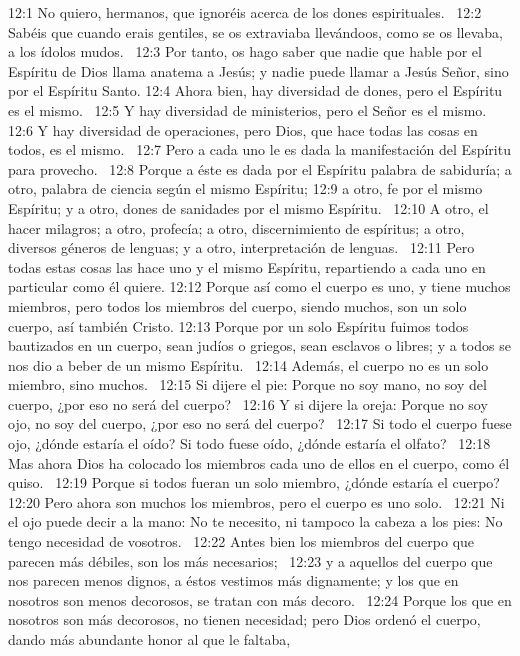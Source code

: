 12:1 No quiero, hermanos, que ignoréis acerca de los dones espirituales.  
12:2 Sabéis que cuando erais gentiles, se os extraviaba llevándoos, como se os llevaba, a los ídolos mudos.  
12:3 Por tanto, os hago saber que nadie que hable por el Espíritu de Dios llama anatema a Jesús; y nadie puede llamar a Jesús Señor, sino por el Espíritu Santo. 
12:4 Ahora bien, hay diversidad de dones, pero el Espíritu es el mismo.  
12:5 Y hay diversidad de ministerios, pero el Señor es el mismo.  
12:6 Y hay diversidad de operaciones, pero Dios, que hace todas las cosas en todos, es el mismo.  
12:7 Pero a cada uno le es dada la manifestación del Espíritu para provecho.  
12:8 Porque a éste es dada por el Espíritu palabra de sabiduría; a otro, palabra de ciencia según el mismo Espíritu; 
12:9 a otro, fe por el mismo Espíritu; y a otro, dones de sanidades por el mismo Espíritu.  
12:10 A otro, el hacer milagros; a otro, profecía; a otro, discernimiento de espíritus; a otro, diversos géneros de lenguas; y a otro, interpretación de lenguas.  
12:11 Pero todas estas cosas las hace uno y el mismo Espíritu, repartiendo a cada uno en particular como él quiere. 
12:12 Porque así como el cuerpo es uno, y tiene muchos miembros, pero todos los miembros del cuerpo, siendo muchos, son un solo cuerpo, así también Cristo. 
12:13 Porque por un solo Espíritu fuimos todos bautizados en un cuerpo, sean judíos o griegos, sean esclavos o libres; y a todos se nos dio a beber de un mismo Espíritu.  
12:14 Además, el cuerpo no es un solo miembro, sino muchos.  
12:15 Si dijere el pie: Porque no soy mano, no soy del cuerpo, ¿por eso no será del cuerpo?  
12:16 Y si dijere la oreja: Porque no soy ojo, no soy del cuerpo, ¿por eso no será del cuerpo?  
12:17 Si todo el cuerpo fuese ojo, ¿dónde estaría el oído? Si todo fuese oído, ¿dónde estaría el olfato?  
12:18 Mas ahora Dios ha colocado los miembros cada uno de ellos en el cuerpo, como él quiso.  
12:19 Porque si todos fueran un solo miembro, ¿dónde estaría el cuerpo?  
12:20 Pero ahora son muchos los miembros, pero el cuerpo es uno solo.  
12:21 Ni el ojo puede decir a la mano: No te necesito, ni tampoco la cabeza a los pies: No tengo necesidad de vosotros.  
12:22 Antes bien los miembros del cuerpo que parecen más débiles, son los más necesarios;  
12:23 y a aquellos del cuerpo que nos parecen menos dignos, a éstos vestimos más dignamente; y los que en nosotros son menos decorosos, se tratan con más decoro.  
12:24 Porque los que en nosotros son más decorosos, no tienen necesidad; pero Dios ordenó el cuerpo, dando más abundante honor al que le faltaba,  
